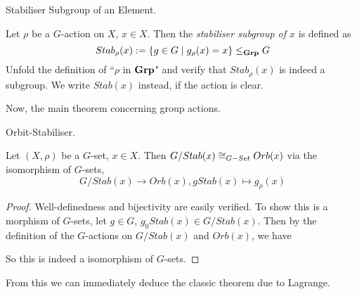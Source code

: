\documentclass[../../book.tex]{subfiles}
\begin{document}
\begin{dfn} Stabiliser Subgroup of an Element. 

    Let $\rho$ be a $G$-action on $X$, $x \in X$. 
    Then the \emph{stabiliser subgroup of $x$} is defined as
    \[
        Stab_\rho(x) := \{g \in G \mid g_\rho(x) = x\} \leq_{\mathbf{Grp}} G
    \]
    Unfold the definition of ``$\rho$ in $\mathbf{Grp}$" and verify that 
    $Stab_\rho(x)$ is indeed a subgroup. 
    We write $Stab(x)$ instead, if the action is clear. 

\end{dfn}
Now, the main theorem concerning group actions. 
\begin{thm} Orbit-Stabiliser. 
    
    Let $(X,\rho)$ be a $G$-set, $x \in X$.
    Then $G / Stab(x) \cong_{G-Set} Orb(x)$ via the isomorphism of $G$-sets, 
    \[
        G / Stab(x) \to Orb(x), gStab(x) \mapsto g_\rho(x)
    \]
\end{thm}
\begin{proof}
    Well-definedness and bijectivity are easily verified. 
    To show this is a morphism of $G$-sets, let $g \in G$, $g_0Stab(x) \in G / Stab(x)$. 
    Then by the definition of the $G$-actions on $G/Stab(x)$ and $Orb(x)$, 
    we have 
    \begin{figure}[ht]
        \centering
    \end{figure}
    
    So this is indeed a isomorphism of $G$-sets. 
\end{proof}

From this we can immediately deduce the classic theorem due to Lagrange. 
\end{document}
